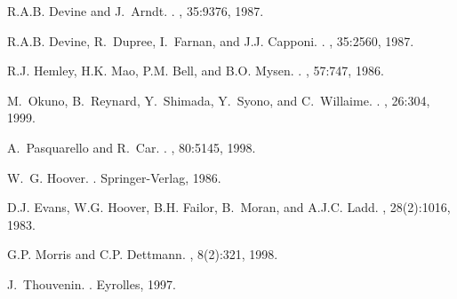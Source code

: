 \documentclass[aps,10pt,twocolumn]{revtex4}
\begin{document}
\begin{thebibliography}{10}
R.A.B. Devine and J.~Arndt.
\newblock {}.
, 35:9376, 1987.

R.A.B. Devine, R.~Dupree, I.~Farnan, and J.J. Capponi.
\newblock {}.
, 35:2560, 1987.

R.J. Hemley, H.K. Mao, P.M. Bell, and B.O. Mysen.
\newblock {}.
, 57:747, 1986.

M.~Okuno, B.~Reynard, Y.~Shimada, Y.~Syono, and C.~Willaime.
\newblock {}.
, 26:304, 1999.

A.~Pasquarello and R.~Car.
\newblock {}.
, 80:5145, 1998.

W.~G. Hoover.
.
\newblock Springer-Verlag, 1986.

D.J. Evans, W.G. Hoover, B.H. Failor, B.~Moran, and A.J.C. Ladd.
, 28(2):1016, 1983.

G.P. Morris and C.P. Dettmann.
, 8(2):321, 1998.

J.~Thouvenin.
.
\newblock Eyrolles, 1997.

\end{thebibliography}
\end{document}
